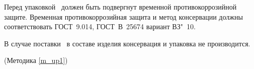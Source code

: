 Перед упаковкой \dut \ должен быть подвергнут временной противокоррозийной защите. Временная противокоррозийная защита и метод консервации должны соответствовать ГОСТ~9.014, ГОСТ~В~25674 вариант ВЗ"~10.

В случае поставки \dut \ в составе изделия консервация и упаковка не производится.

\begin{flushright}
	(Методика \ref{m_up1})
\end{flushright}